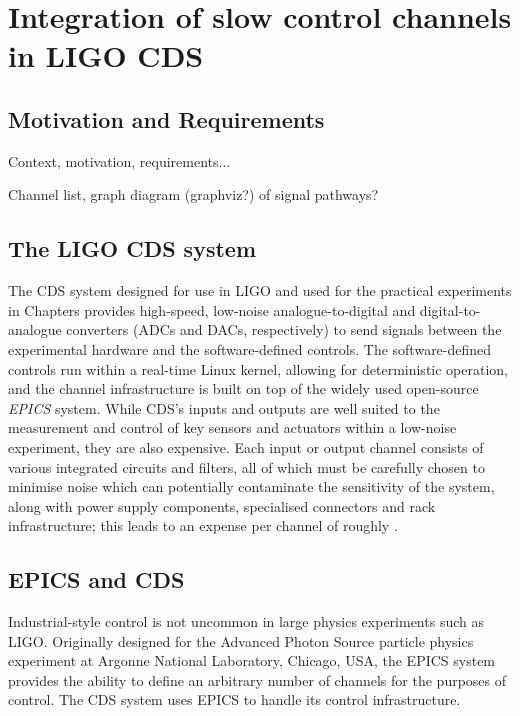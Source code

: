 \chapter{Integration of slow control channels in LIGO CDS}
\label{c:slow-controls-integration}

\section{Motivation and Requirements}
Context, motivation, requirements...

Channel list, graph diagram (graphviz?) of signal pathways?

\section{The LIGO CDS system}
The \gls{CDS} system designed for use in \gls{LIGO} and used for the practical experiments in Chapters  provides high-speed, low-noise analogue-to-digital and digital-to-analogue converters (\glspl{ADC} and \glspl{DAC}, respectively) to send signals between the experimental hardware and the software-defined controls. The software-defined controls run within a real-time Linux kernel, allowing for deterministic operation, and the channel infrastructure is built on top of the widely used open-source \emph{\gls{EPICS}} system. While \gls{CDS}'s inputs and outputs are well suited to the measurement and control of key sensors and actuators within a low-noise experiment, they are also expensive. Each input or output channel consists of various integrated circuits and filters, all of which must be carefully chosen to minimise noise which can potentially contaminate the sensitivity of the system, along with power supply components, specialised connectors and rack infrastructure; this leads to an expense per channel of roughly .

\section{EPICS and CDS}
Industrial-style control is not uncommon in large physics experiments such as \gls{LIGO}. Originally designed for the Advanced Photon Source particle physics experiment at Argonne National Laboratory, Chicago, USA, the \gls{EPICS} system provides the ability to define an arbitrary number of channels for the purposes of control. The \gls{CDS} system uses \gls{EPICS} to handle its control infrastructure.

